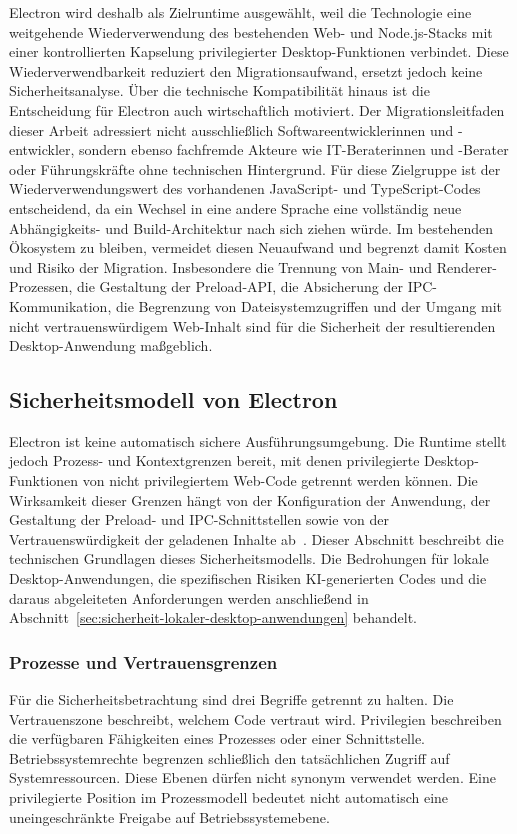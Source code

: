 Electron wird deshalb als Zielruntime ausgewählt, weil die Technologie eine weitgehende Wiederverwendung des bestehenden Web- und Node.js-Stacks mit einer kontrollierten Kapselung privilegierter Desktop-Funktionen verbindet.
Diese Wiederverwendbarkeit reduziert den Migrationsaufwand, ersetzt jedoch keine Sicherheitsanalyse.
Über die technische Kompatibilität hinaus ist die Entscheidung für Electron auch wirtschaftlich motiviert.
Der Migrationsleitfaden dieser Arbeit adressiert nicht ausschließlich Softwareentwicklerinnen und -entwickler, sondern ebenso fachfremde Akteure wie IT-Beraterinnen und -Berater oder Führungskräfte ohne technischen Hintergrund.
Für diese Zielgruppe ist der Wiederverwendungswert des vorhandenen JavaScript- und TypeScript-Codes entscheidend, da ein Wechsel in eine andere Sprache eine vollständig neue Abhängigkeits- und Build-Architektur nach sich ziehen würde.
Im bestehenden Ökosystem zu bleiben, vermeidet diesen Neuaufwand und begrenzt damit Kosten und Risiko der Migration.
Insbesondere die Trennung von Main- und Renderer-Prozessen, die Gestaltung der Preload-API, die Absicherung der IPC-Kommunikation, die Begrenzung von Dateisystemzugriffen und der Umgang mit nicht vertrauenswürdigem Web-Inhalt sind für die Sicherheit der resultierenden Desktop-Anwendung maßgeblich.
\subsection{Sicherheitsmodell von Electron}
\label{sec:electron-security}
Electron ist keine automatisch sichere Ausführungsumgebung.
Die Runtime stellt jedoch Prozess- und Kontextgrenzen bereit, mit denen privilegierte Desktop-Funktionen von nicht privilegiertem Web-Code getrennt werden können.
Die Wirksamkeit dieser Grenzen hängt von der Konfiguration der Anwendung, der Gestaltung der Preload- und IPC-Schnittstellen sowie von der Vertrauenswürdigkeit der geladenen Inhalte ab~\cite{electron2026security}.
Dieser Abschnitt beschreibt die technischen Grundlagen dieses Sicherheitsmodells.
Die Bedrohungen für lokale Desktop-Anwendungen, die spezifischen Risiken KI-generierten Codes und die daraus abgeleiteten Anforderungen werden anschließend in Abschnitt~\ref{sec:sicherheit-lokaler-desktop-anwendungen} behandelt.

\subsubsection{Prozesse und Vertrauensgrenzen}
Für die Sicherheitsbetrachtung sind drei Begriffe getrennt zu halten.
Die Vertrauenszone beschreibt, welchem Code vertraut wird.
Privilegien beschreiben die verfügbaren Fähigkeiten eines Prozesses oder einer Schnittstelle.
Betriebssystemrechte begrenzen schließlich den tatsächlichen Zugriff auf Systemressourcen.
Diese Ebenen dürfen nicht synonym verwendet werden.
Eine privilegierte Position im Prozessmodell bedeutet nicht automatisch eine uneingeschränkte Freigabe auf Betriebssystemebene.

